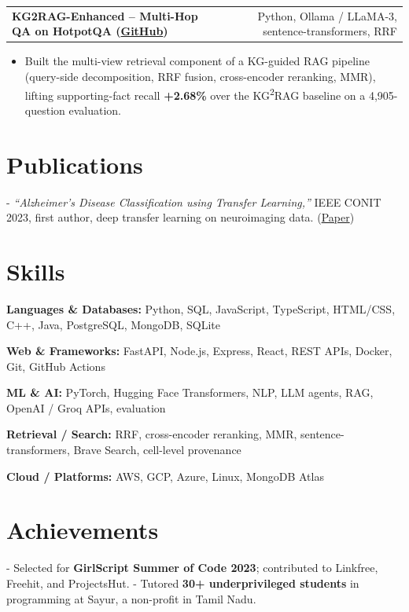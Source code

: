 \documentclass[letterpaper,11pt]{article}
\makeatletter
\newcommand{\projItem}[2]{%
  \vspace{4pt}
  \begin{tabular*}{\textwidth}{@{}l@{\extracolsep{\fill}}r@{}}
    \textbf{#1} & #2 \\
  \end{tabular*}\par\vspace{-2pt}
}
\newcommand{\skillLine}[2]{\textbf{#1:} #2\par\vspace{2pt}}
\newcommand{\inlineBlock}[1]{{\setlength{\leftskip}{0.18in}\small #1\par}}
\makeatother
\begin{document}
\projItem{KG2RAG-Enhanced -- Multi-Hop QA on HotpotQA {\normalfont\small(\href{https://github.com/Deva-1903/KG2RAG-685-NLP}{GitHub})}}{Python, Ollama / LLaMA-3, sentence-transformers, RRF}
\begin{itemize}
  \item Built the multi-view retrieval component of a KG-guided RAG pipeline (query-side decomposition, RRF fusion, cross-encoder reranking, MMR), lifting supporting-fact recall \textbf{+2.68\%} over the KG\textsuperscript{2}RAG baseline on a 4{,}905-question evaluation.
\end{itemize}

\section{Publications}
\inlineBlock{- \textit{``Alzheimer's Disease Classification using Transfer Learning,''} IEEE CONIT 2023, first author, deep transfer learning on neuroimaging data. {\normalfont\small(\href{https://ieeexplore.ieee.org/document/10205760}{Paper})}}

\section{Skills}
\skillLine{Languages \& Databases}{Python, SQL, JavaScript, TypeScript, HTML/CSS, C++, Java, PostgreSQL, MongoDB, SQLite}
\skillLine{Web \& Frameworks}{FastAPI, Node.js, Express, React, REST APIs, Docker, Git, GitHub Actions}
\skillLine{ML \& AI}{PyTorch, Hugging Face Transformers, NLP, LLM agents, RAG, OpenAI / Groq APIs, evaluation}
\skillLine{Retrieval / Search}{RRF, cross-encoder reranking, MMR, sentence-transformers, Brave Search, cell-level provenance}
\skillLine{Cloud / Platforms}{AWS, GCP, Azure, Linux, MongoDB Atlas}

\section{Achievements}
\inlineBlock{- Selected for \textbf{GirlScript Summer of Code 2023}; contributed to Linkfree, Freehit, and ProjectsHut. - Tutored \textbf{30+ underprivileged students} in programming at Sayur, a non-profit in Tamil Nadu.}
\end{document}
